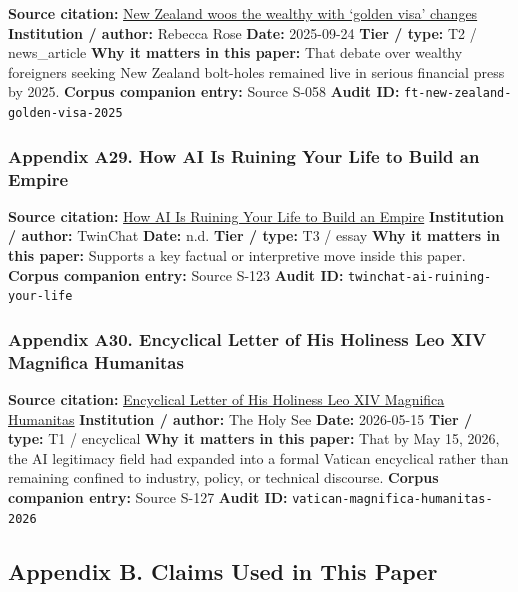 \documentclass[
  american,
  11pt,
  letterpaper,
]{article}
\begin{document}
\textbf{Source citation:}
\href{https://www.ft.com/content/76ca455c-3b16-4413-8738-3f17431d125b}{New
Zealand woos the wealthy with `golden visa' changes} \textbf{Institution
/ author:} Rebecca Rose \textbf{Date:} 2025-09-24 \textbf{Tier / type:}
T2 / news\_article \textbf{Why it matters in this paper:} That debate
over wealthy foreigners seeking New Zealand bolt-holes remained live in
serious financial press by 2025. \textbf{Corpus companion entry:} Source
S-058 \textbf{Audit ID:} \texttt{ft-new-zealand-golden-visa-2025}

\subsubsection{Appendix A29. How AI Is Ruining Your Life to Build an
Empire}\label{ch-10-appendix-a29-how-ai-is-ruining-your-life-to-build-an-empire}

\textbf{Source citation:}
\href{https://medium.com/twinchat/how-ai-is-ruining-your-life-to-build-an-empire-8b6d02e55bc9}{How
AI Is Ruining Your Life to Build an Empire} \textbf{Institution /
author:} TwinChat \textbf{Date:} n.d. \textbf{Tier / type:} T3 / essay
\textbf{Why it matters in this paper:} Supports a key factual or
interpretive move inside this paper. \textbf{Corpus companion entry:}
Source S-123 \textbf{Audit ID:} \texttt{twinchat-ai-ruining-your-life}

\subsubsection{Appendix A30. Encyclical Letter of His Holiness Leo XIV
Magnifica
Humanitas}\label{ch-10-appendix-a30-encyclical-letter-of-his-holiness-leo-xiv-magnifica-humanitas}

\textbf{Source citation:}
\href{https://www.vatican.va/content/leo-xiv/en/encyclicals/documents/20260515-magnifica-humanitas.html}{Encyclical
Letter of His Holiness Leo XIV Magnifica Humanitas} \textbf{Institution
/ author:} The Holy See \textbf{Date:} 2026-05-15 \textbf{Tier / type:}
T1 / encyclical \textbf{Why it matters in this paper:} That by May 15,
2026, the AI legitimacy field had expanded into a formal Vatican
encyclical rather than remaining confined to industry, policy, or
technical discourse. \textbf{Corpus companion entry:} Source S-127
\textbf{Audit ID:} \texttt{vatican-magnifica-humanitas-2026}

\subsection{Appendix B. Claims Used in This
Paper}\label{appendix-b.-claims-used-in-this-paper-10}
\end{document}
